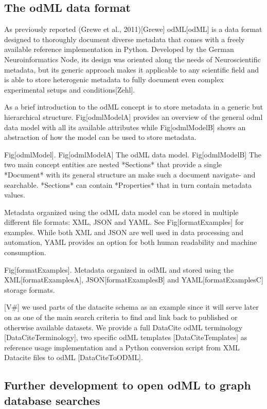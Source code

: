 \documentclass{article}
\begin{document}
\subsection{The odML data format}
As previously reported (Grewe et al., 2011)[Grewe] odML[odML] is a data format
designed to thoroughly document diverse metadata that comes with a freely available
reference implementation in Python. Developed by the
German Neuroinformatics Node, its design was oriented along the needs
of Neuroscientific metadata, but its generic approach makes it applicable
to any scientific field and is able to store heterogenic metadata to fully document
even complex experimental setups and conditions[Zehl].

As a brief introduction to the odML concept is to store metadata in a
generic but hierarchical structure. Fig[odmlModelA] provides an overview of the
general odml data model with all its available attributes while Fig[odmlModelB]
shows an abstraction of how the model can be used to store metadata.

Fig[odmlModel]. Fig[odmlModelA] The odML data model. Fig[odmlModelB] The two main concept
entities are nested *Sections* that provide a single *Document* with its general
structure an make such a document navigate- and searchable. *Sections*
can contain *Properties* that in turn contain metadata values.

Metadata organized using the odML data model can be stored in multiple
different file formats: XML, JSON and YAML. See Fig[formatExamples] for examples.
While both XML and JSON are well used in data processing and automation, YAML
provides an option for both human readability and machine consumption.

Fig[formatExamples]. Metadata organized in odML and stored using the XML[formatExamplesA],
JSON[formatExamplesB] and YAML[formatExamplesC] storage formats.

[V#] we used parts of the datacite schema as an example since it will serve later on as
one of the main search criteria to find and link back to published or otherwise
available datasets. We provide a full DataCite odML terminology [DataCiteTerminology],
two specific odML templates [DataCiteTemplates] as reference usage implementation and
a Python conversion script from XML Datacite files to odML [DataCiteToODML].

\subsection{Further development to open odML to graph database searches}
\end{document}
